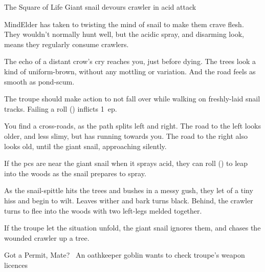 
{The Square of Life}%
{Giant snail devours \gls{crawler} in acid attack}%

\begin{exampletext}
  \Gls{MindElder} has taken to twisting the mind of snail to make them crave flesh.
  They wouldn't normally hunt well, but the acidic spray, and disarming look, means they regularly consume \glspl{crawler}.
\end{exampletext}

\begin{boxtext}
  The echo of a distant crow's cry reaches you, just before dying.
  The trees look a kind of uniform-brown, without any mottling or variation.
  And the road feels as smooth as pond-scum.
\end{boxtext}

The troupe should make  action to not fall over while walking on freshly-laid snail tracks.
Failing a  roll (\tn[7]) inflicts 1~\gls{ep}.

\begin{boxtext}
  You find a cross-roads, as the path splits left and right.
  The road to the left looks older, and less slimy, but has  running towards you.
  The road to the right also looks old, until the giant snail, approaching silently.
\end{boxtext}

If the \glspl{pc} are near the giant snail when it sprays acid, they can roll  (\tn[7]) to leap into the woods as the snail prepares to spray.

\begin{boxtext}
  As the snail-spittle hits the trees and bushes in a messy gush, they let of a tiny hiss and begin to wilt.
  Leaves wither and bark turns black.
  Behind, the \gls{crawler} turns to flee into the woods with two left-legs melded together.
\end{boxtext}

\giantSnail

\chitincrawler

If the troupe let the situation unfold, the giant snail ignores them, and chases the wounded \gls{crawler} up a tree.

{Got a Permit, Mate?}%
{~An oathkeeper goblin wants to check troupe's weapon licences}%

